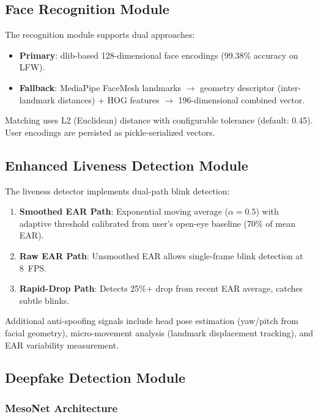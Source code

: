 \documentclass[conference,10pt]{IEEEtran}
\begin{document}
\subsection{Face Recognition Module}

The recognition module supports dual approaches:
\begin{itemize}
    \item \textbf{Primary}: dlib-based 128-dimensional face encodings (99.38\% accuracy on LFW).
    \item \textbf{Fallback}: MediaPipe FaceMesh landmarks $\rightarrow$ geometry descriptor (inter-landmark distances) + HOG features $\rightarrow$ 196-dimensional combined vector.
\end{itemize}

Matching uses L2 (Euclidean) distance with configurable tolerance (default: 0.45). User encodings are persisted as pickle-serialized vectors.

\subsection{Enhanced Liveness Detection Module}

The liveness detector implements dual-path blink detection:

\begin{enumerate}
    \item \textbf{Smoothed EAR Path}: Exponential moving average ($\alpha = 0.5$) with adaptive threshold calibrated from user's open-eye baseline (70\% of mean EAR).
    \item \textbf{Raw EAR Path}: Unsmoothed EAR allows single-frame blink detection at 8~FPS.
    \item \textbf{Rapid-Drop Path}: Detects 25\%+ drop from recent EAR average, catches subtle blinks.
\end{enumerate}

Additional anti-spoofing signals include head pose estimation (yaw/pitch from facial geometry), micro-movement analysis (landmark displacement tracking), and EAR variability measurement.

\subsection{Deepfake Detection Module}

\subsubsection{MesoNet Architecture}
\end{document}
